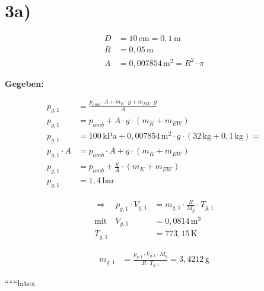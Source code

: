 

\section*{3a)}

\begin{align*}
D &= 10 \, \text{cm} = 0{,}1 \, \text{m} \\
R &= 0{,}05 \, \text{m} \\
A &= 0{,}007854 \, \text{m}^2 = R^2 \cdot \pi
\end{align*}

\textbf{Gegeben:}

\begin{align*}
p_{g,1} &= \frac{p_{amb} \cdot A + m_K \cdot g + m_{EW} \cdot g}{A} \\
p_{g,1} &= p_{amb} + A \cdot g \cdot (m_K + m_{EW}) \\
p_{g,1} &= 100 \, \text{kPa} + 0{,}007854 \, \text{m}^2 \cdot g \cdot (32 \, \text{kg} + 0{,}1 \, \text{kg}) = \\
p_{g,1} \cdot A &= p_{amb} \cdot A + g \cdot (m_K + m_{EW}) \\
p_{g,1} &= p_{amb} + \frac{g}{A} \cdot (m_K + m_{EW}) \\
p_{g,1} &= 1{,}4 \, \text{bar}
\end{align*}

\begin{align*}
\Rightarrow \quad p_{g,1} \cdot V_{g,1} &= m_{g,1} \cdot \frac{R}{M_g} \cdot T_{g,1} \\
\text{mit} \quad V_{g,1} &= 0{,}0814 \, \text{m}^3 \\
T_{g,1} &= 773{,}15 \, \text{K}
\end{align*}

\begin{align*}
m_{g,1} &= \frac{p_{g,1} \cdot V_{g,1} \cdot M_g}{R \cdot T_{g,1}} = 3{,}4212 \, \text{g}
\end{align*}

``````latex